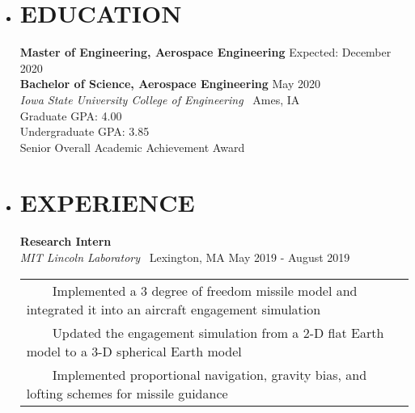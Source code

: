 \documentclass[overlapped, 11pt]{res}
\newcommand{\tabitem}{~~\textbullet~~}
\begin{document}
\address
{
    605 East 16th Street Pella, IA 50219 
    \textbar \ (641) 780-9473 
    \textbar \ carldevries@gmail.com 
}

\begin{resume}

    \begin{itemize}
    
        \item[]\section{EDUCATION}
        
            \textbf{Master of Engineering, Aerospace Engineering} \hfill Expected: December 2020 \\
            \textbf{Bachelor of Science, Aerospace Engineering} \hfill May 2020 \\
            \emph{Iowa State University College of Engineering} \textbar
                \ Ames, IA \\
                Graduate GPA: 4.00 \\
                Undergraduate GPA: 3.85 \\
                Senior Overall Academic Achievement Award

        \item[]\section{EXPERIENCE}
        
            \textbf{Research Intern}\\
            \emph{MIT Lincoln Laboratory} \textbar 
                \ Lexington, MA \hfill May 2019 - August 2019
            \begin{tabular}{l}
                \tabitem Implemented a 3 degree of freedom missile model and integrated it into an aircraft engagement simulation \\
                \tabitem Updated the engagement simulation from a 2-D flat Earth model to a 3-D spherical Earth model \\
                \tabitem Implemented proportional navigation, gravity bias, and lofting schemes for missile guidance \\
           \end{tabular}


\end{itemize}
\end{resume}
\end{document}
